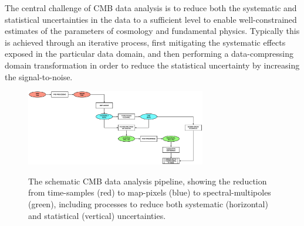 The central challenge of CMB data analysis is to reduce both the systematic and statistical uncertainties in the data to a sufficient level to enable well-constrained estimates of the parameters of cosmology and fundamental physics. Typically this is achieved through an iterative process, first mitigating the systematic effects exposed in the particular data domain, and then performing a data-compressing domain transformation in order to reduce the statistical uncertainty by increasing the signal-to-noise.

\begin{figure}[htbp]
\hspace{1.1in}\includegraphics[width=0.7\textwidth]{Analysis/da}\\
\caption{The schematic CMB data analysis pipeline, showing the reduction from time-samples (red) to map-pixels (blue) to spectral-multipoles (green), including processes to reduce both systematic (horizontal) and statistical (vertical) uncertainties.}
\label{fig_da}
\end{figure}

